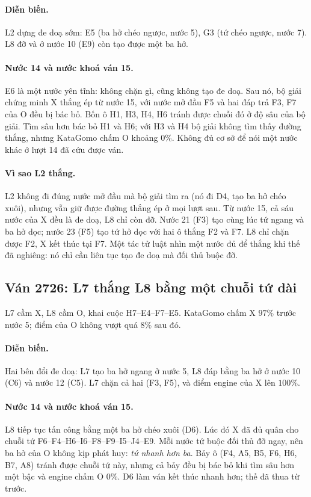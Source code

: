 \paragraph{Diễn biến.} L2 dựng đe doạ sớm: E5 (ba hở chéo ngược, nước 5), G3 (tứ chéo ngược, nước 7). L8 đỡ và ở nước 10
(E9) còn tạo được một ba hở.

\paragraph{Nước 14 và nước khoá ván 15.} E6 là một nước yên tĩnh: không chặn gì, cũng không tạo đe doạ. Sau nó, bộ giải
chứng minh X thắng ép từ nước 15, với nước mở đầu F5 và hai đáp trả F3, F7 của O đều bị bác bỏ. Bốn ô H1, H3, H4, H6
tránh được chuỗi đó ở độ sâu của bộ giải. Tìm sâu hơn bác bỏ H1 và H6; với H3 và H4 bộ giải không tìm thấy đường thắng,
nhưng KataGomo chấm O khoảng $0\%$. Không đủ cơ sở để nói một nước khác ở lượt 14 đã cứu được ván.

\paragraph{Vì sao L2 thắng.} L2 không đi đúng nước mở đầu mà bộ giải tìm ra (nó đi D4, tạo ba hở chéo xuôi), nhưng vẫn
giữ được đường thắng ép ở mọi lượt sau. Từ nước 15, cả sáu nước của X đều là đe doạ, L8 chỉ còn đỡ. Nước 21 (F3) tạo
cùng lúc tứ ngang và ba hở dọc; nước 23 (F5) tạo tứ hở dọc với hai ô thắng F2 và F7. L8 chỉ chặn được F2, X kết thúc tại
F7. Một tác tử luật nhìn một nước đủ để thắng khi thế đã nghiêng: nó chỉ cần liên tục tạo đe doạ mà đối thủ buộc đỡ.


\subsection{Ván 2726: L7 thắng L8 bằng một chuỗi tứ dài}
\label{sec:cs-vs-2726}
L7 cầm X, L8 cầm O, khai cuộc H7--E4--F7--E5. KataGomo chấm X $97\%$ trước nước 5; điểm của O không vượt quá $8\%$ sau đó.

\paragraph{Diễn biến.} Hai bên đổi đe doạ: L7 tạo ba hở ngang ở nước 5, L8 đáp bằng ba hở ở nước 10 (C6) và nước 12 (C5).
L7 chặn cả hai (F3, F5), và điểm engine của X lên $100\%$.

\paragraph{Nước 14 và nước khoá ván 15.} L8 tiếp tục tấn công bằng một ba hở chéo xuôi (D6). Lúc đó X đã đủ quân cho chuỗi
tứ F6--F4--H6--I6--F8--F9--I5--J4--E9. Mỗi nước tứ buộc đối thủ đỡ ngay, nên ba hở của O không kịp phát huy: \emph{tứ
nhanh hơn ba}. Bảy ô (F4, A5, B5, F6, H6, B7, A8) tránh được chuỗi tứ này, nhưng cả bảy đều bị bác bỏ khi tìm sâu hơn một
bậc và engine chấm O $0\%$. D6 làm ván kết thúc nhanh hơn; thế đã thua từ trước.

